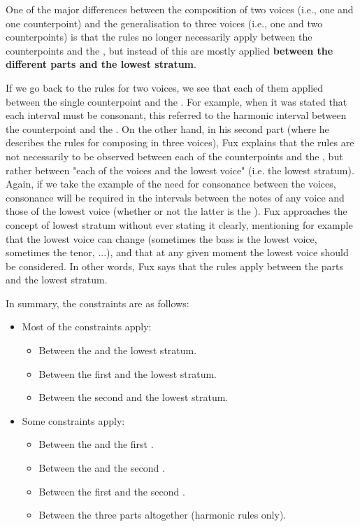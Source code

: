 One of the major differences between the composition of two voices (i.e., one \cfs and one counterpoint) and the generalisation to three voices (i.e., one \cfs and two counterpoints) is that the rules no longer necessarily apply between the counterpoints and the \cf, but instead of this are mostly applied \textbf{between the different parts and the lowest stratum}. 

If we go back to the rules for two voices, we see that each of them applied between the single counterpoint and the \cf. For example, when it was stated that each interval must be consonant, this referred to the harmonic interval between the counterpoint and the \cf.
On the other hand, in his second part (where he describes the rules for composing in three voices), Fux explains that the rules are not necessarily to be observed between each of the counterpoints and the \cf, but rather between "each of the voices and the lowest voice" (i.e. the lowest stratum). Again, if we take the example of the need for consonance between the voices, consonance will be required in the intervals between the notes of any voice and those of the lowest voice (whether or not the latter is the \cf).
Fux approaches the concept of lowest stratum without ever stating it clearly, mentioning for example that the lowest voice can change (sometimes the bass is the lowest voice, sometimes the tenor, ...), and that at any given moment the lowest voice should be considered. In other words, Fux says that the rules apply between the parts and the lowest stratum.

In summary, the constraints are as follows:
\begin{itemize}
    \item Most of the constraints apply:
    \begin{itemize}
        \item Between the \cfs and the lowest stratum.
        \item Between the first \cps and the lowest stratum.
        \item Between the second \cps and the lowest stratum.
    \end{itemize}
    \item Some constraints apply:
    \begin{itemize}
        \item Between the \cfs and the first \cp.
        \item Between the \cfs and the second \cp.
        \item Between the first \cps and the second \cp.
        \item Between the three parts altogether (harmonic rules only).
    \end{itemize}

\end{itemize}


